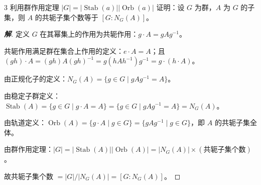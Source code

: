 \documentclass[12pt, a4paper]{article}
\newenvironment{solution}{
    \begin{proof}[\textbf{解}]
}{
    \end{proof}
}
\begin{document}
\begin{problem}{3}
    利用群作用定理 $|G|=|\operatorname{Stab}(a)||\operatorname{Orb}(a)|$ 证明：设 $G$ 为群，$A$ 为 $G$ 的子集，则 $A$ 的共轭子集个数等于 $[G:N_G(A)]$。
\end{problem}
\begin{solution}
    定义 $G$ 在其幂集上的作用为共轭作用：$g \cdot A = gAg^{-1}$。

    共轭作用满足群在集合上作用的定义：$e \cdot A = A$；且 $(gh) \cdot A = (gh)A(gh)^{-1} = g(hAh^{-1})g^{-1} = g \cdot (h \cdot A)$。

    由正规化子的定义：$N_G(A) = \{g \in G \mid gAg^{-1} = A\}$。

    由稳定子群定义：$\operatorname{Stab}(A) = \{g \in G \mid g \cdot A = A\} = \{g \in G \mid gAg^{-1} = A\} = N_G(A)$。

    由轨道定义：$\operatorname{Orb}(A) = \{g \cdot A \mid g \in G\} = \{gAg^{-1} \mid g \in G\}$，即 $A$ 的共轭子集全体。

    由群作用定理：$|G| = |\operatorname{Stab}(A)||\operatorname{Orb}(A)| = |N_G(A)| \times (\text{共轭子集个数})$。
    
    故共轭子集个数 $= |G|/|N_G(A)| = [G:N_G(A)]$。
\end{solution}
\end{document}
